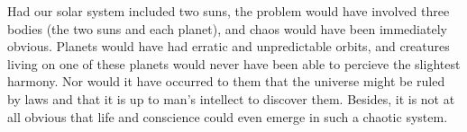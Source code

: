 Had our solar system included two suns, the problem would have
involved three bodies (the two suns and each planet), and chaos
would have been immediately obvious. Planets would have had
erratic and unpredictable orbits, and creatures living on one
of these planets would never have been able to percieve the
slightest harmony. Nor would it have occurred to them that the
universe might be ruled by laws and that it is up to man's
intellect to discover them. Besides, it is not at all obvious
that life and conscience could even emerge in such a chaotic
system.